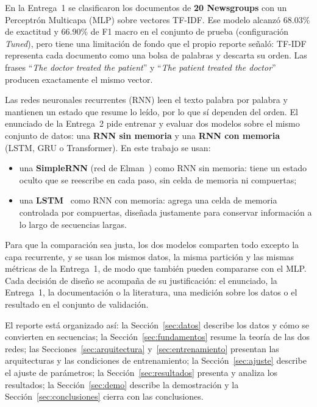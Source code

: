 \documentclass[12pt, a4paper]{article}
\begin{document}
En la Entrega~1 se clasificaron los documentos de \textbf{20 Newsgroups} con un Perceptrón Multicapa (MLP) sobre vectores TF-IDF. Ese modelo alcanzó $68.03\%$ de exactitud y $66.90\%$ de F1 macro en el conjunto de prueba (configuración \textit{Tuned}), pero tiene una limitación de fondo que el propio reporte señaló: TF-IDF representa cada documento como una bolsa de palabras y descarta su orden. Las frases ``\textit{The doctor treated the patient}'' y ``\textit{The patient treated the doctor}'' producen exactamente el mismo vector.

Las redes neuronales recurrentes (RNN) leen el texto palabra por palabra y mantienen un estado que resume lo leído, por lo que sí dependen del orden. El enunciado de la Entrega~2 pide entrenar y evaluar dos modelos sobre el mismo conjunto de datos: una \textbf{RNN sin memoria} y una \textbf{RNN con memoria} (LSTM, GRU o Transformer). En este trabajo se usan:
\begin{itemize}
    \item una \textbf{SimpleRNN} (red de Elman~\cite{elman1990}) como RNN sin memoria: tiene un estado oculto que se reescribe en cada paso, sin celda de memoria ni compuertas;
    \item una \textbf{LSTM}~\cite{hochreiter1997} como RNN con memoria: agrega una celda de memoria controlada por compuertas, diseñada justamente para conservar información a lo largo de secuencias largas.
\end{itemize}

Para que la comparación sea justa, los dos modelos comparten todo excepto la capa recurrente, y se usan los mismos datos, la misma partición y las mismas métricas de la Entrega~1, de modo que también pueden compararse con el MLP. Cada decisión de diseño se acompaña de su justificación: el enunciado, la Entrega~1, la documentación o la literatura, una medición sobre los datos o el resultado en el conjunto de validación.

El reporte está organizado así: la Sección~\ref{sec:datos} describe los datos y cómo se convierten en secuencias; la Sección~\ref{sec:fundamentos} resume la teoría de las dos redes; las Secciones~\ref{sec:arquitectura} y~\ref{sec:entrenamiento} presentan las arquitecturas y las condiciones de entrenamiento; la Sección~\ref{sec:ajuste} describe el ajuste de parámetros; la Sección~\ref{sec:resultados} presenta y analiza los resultados; la Sección~\ref{sec:demo} describe la demostración y la Sección~\ref{sec:conclusiones} cierra con las conclusiones.
\end{document}
